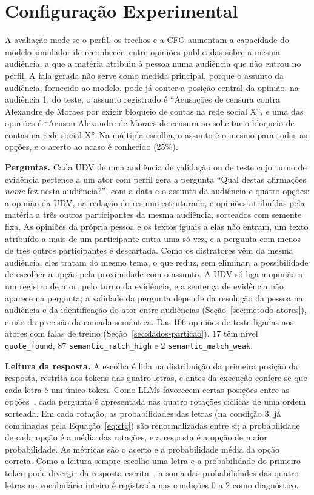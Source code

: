 \section{Configura\c{c}\~ao Experimental}
\label{sec:setup}

A avaliação mede se o perfil, os trechos e a CFG aumentam a capacidade do modelo simulador de
reconhecer, entre opiniões publicadas sobre a mesma audiência, a que a matéria atribuiu à pessoa numa
audiência que não entrou no perfil. A fala gerada não serve como medida principal, porque o assunto
da audiência, fornecido ao modelo, pode já conter a posição central da opinião: na audiência 1, do
teste, o assunto registrado é ``Acusações de censura contra Alexandre de Moraes por exigir bloqueio de
contas na rede social X'', e uma das opiniões é ``Acusou Alexandre de Moraes de censura ao solicitar o
bloqueio de contas na rede social X''. Na múltipla escolha, o assunto é o mesmo para todas as opções,
e o acerto ao acaso é conhecido (25\%).

\textbf{Perguntas.} Cada UDV de uma audiência de validação ou de teste cujo turno de evidência
pertence a um ator com perfil gera a pergunta ``Qual destas afirmações \textit{nome} fez nesta
audiência?'', com a data e o assunto da audiência e quatro opções: a opinião da UDV, na redação do
resumo estruturado, e opiniões atribuídas pela matéria a três outros participantes da mesma
audiência, sorteados com semente fixa. As opiniões da própria pessoa e os textos iguais a elas não
entram, um texto atribuído a mais de um participante entra uma só vez, e a pergunta com menos de três
outros participantes é descartada. Como os distratores vêm da mesma audiência, eles tratam do mesmo
tema, o que reduz, sem eliminar, a possibilidade de escolher a opção pela proximidade com o assunto.
A UDV só liga a opinião a um registro de ator, pelo turno da evidência, e a sentença de evidência não
aparece na pergunta; a validade da pergunta depende da resolução da pessoa na audiência e da
identificação do ator entre audiências (Seção~\ref{sec:metodo-atores}), e não da precisão da camada
semântica. Das 106 opiniões de teste ligadas aos atores com falas de treino
(Seção~\ref{sec:dados-particao}), 17 têm nível \texttt{quote\_found}, 87 \texttt{semantic\_match\_high}
e 2 \texttt{semantic\_match\_weak}.

\textbf{Leitura da resposta.} A escolha é lida na distribuição da primeira posição da resposta,
restrita aos tokens das quatro letras, e antes da execução confere-se que cada letra é um único
token. Como LLMs favorecem certas posições entre as opções~\citep{zheng2024large,pezeshkpour2024large},
cada pergunta é apresentada nas quatro rotações cíclicas de uma ordem sorteada. Em cada rotação, as
probabilidades das letras (na condição 3, já combinadas pela Equação~\ref{eq:cfg}) são renormalizadas
entre si; a probabilidade de cada opção é a média das rotações, e a resposta é a opção de maior
probabilidade. As métricas são o acerto e a probabilidade
média da opção correta. Como a leitura sempre escolhe uma letra e a probabilidade do primeiro token
pode divergir da resposta escrita~\citep{wang2024answer}, a soma das probabilidades das quatro letras
no vocabulário inteiro é registrada nas condições 0 a 2 como diagnóstico.


